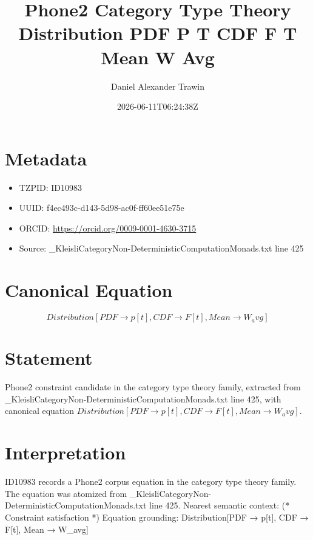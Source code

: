 \documentclass[11pt]{article}
\title{Phone2 Category Type Theory Distribution PDF P T CDF F T Mean W Avg}
\author{Daniel Alexander Trawin}
\date{2026-06-11T06:24:38Z}
\begin{document}
\maketitle
\section*{Metadata}
\begin{itemize}
\item TZPID: ID10983
\item UUID: f4ec493c-d143-5d98-ac0f-ff60ee51e75e
\item ORCID: \url{https://orcid.org/0009-0001-4630-3715}
\item Source: _KleisliCategoryNon-DeterministicComputationMonads.txt line 425
\end{itemize}
\section*{Canonical Equation}
\[
Distribution[PDF → p[t], CDF → F[t], Mean → W_avg]
\]
\section*{Statement}
Phone2 constraint candidate in the category type theory family, extracted from _KleisliCategoryNon-DeterministicComputationMonads.txt line 425, with canonical equation $Distribution[PDF → p[t], CDF → F[t], Mean → W_avg]$.
\section*{Interpretation}
ID10983 records a Phone2 corpus equation in the category type theory family. The equation was atomized from _KleisliCategoryNon-DeterministicComputationMonads.txt line 425. Nearest semantic context: (* Constraint satisfaction *) Equation grounding: Distribution[PDF → p[t], CDF → F[t], Mean → W_avg]
\end{document}

